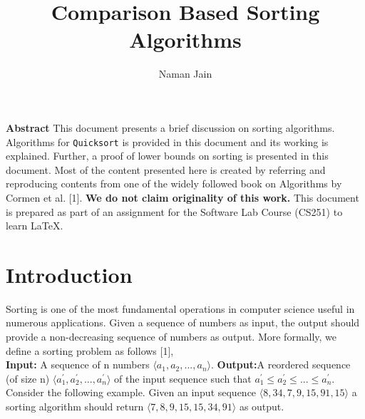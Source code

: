 \documentclass[a4paper, 10pt,twocolumn]{article}
\title{Comparison Based Sorting Algorithms}
\author{ Naman Jain }
\date{}
\begin{document}
\maketitle

\noindent
{\Large\textbf{Abstract}}\newline
This document presents a brief discussion on sorting algorithms. Algorithms for \texttt{Quicksort} is provided in this document and its working is explained. Further, a proof of lower bounds on sorting is presented in this document. Most of the content presented here is created by referring and reproducing contents from one of the widely followed book on Algorithms by Cormen et al. [1]. \textbf{We do not claim originality of this work.} This document is prepared as part of an assignment for the Software Lab
Course (CS251) to learn \LaTeX.\\
\vspace{-4mm}
\section{Introduction}
Sorting is one of the most fundamental operations in computer science useful in numerous applications. Given a sequence of numbers as input, the output should provide a non-decreasing sequence of numbers as output. More formally, we define a
sorting problem as follows [1],\\ 
\textbf{Input:} A sequence of n numbers $\langle a_{1},a_{2},...,a_{n} \rangle$.
\textbf{Output:}A reordered sequence (of size n) $\langle a_{1}^{'},a_{2}^{'},...,a_{n}^{'} \rangle$ of the input sequence such that $a_{1}^{'} \leq a_{2}^{'} \leq ... \leq a_{n}^{'}$.\newline
Consider the following example. Given an input
sequence $\langle 8, 34, 7, 9, 15, 91, 15\rangle$ a sorting algorithm should return $\langle 7, 8, 9, 15, 15, 34, 91\rangle$ as output.
\end{document}
